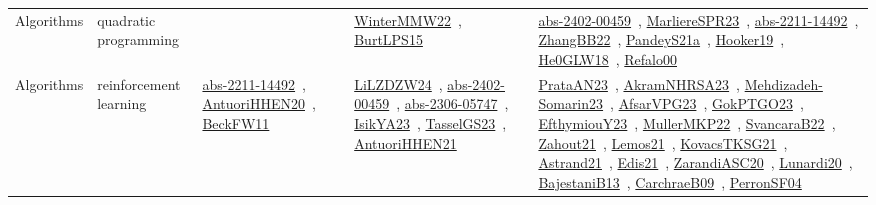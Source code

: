 {\begin{longtable}{lp{3cm}>{\raggedright\arraybackslash}p{6cm}>{\raggedright\arraybackslash}p{6cm}>{\raggedright\arraybackslash}p{8cm}}
Algorithms & quadratic programming &  & \href{../works/WinterMMW22.pdf}{WinterMMW22}~\cite{WinterMMW22}, \href{../works/BurtLPS15.pdf}{BurtLPS15}~\cite{BurtLPS15} & \href{../works/abs-2402-00459.pdf}{abs-2402-00459}~\cite{abs-2402-00459}, \href{../works/MarliereSPR23.pdf}{MarliereSPR23}~\cite{MarliereSPR23}, \href{../works/abs-2211-14492.pdf}{abs-2211-14492}~\cite{abs-2211-14492}, \href{../works/ZhangBB22.pdf}{ZhangBB22}~\cite{ZhangBB22}, \href{../works/PandeyS21a.pdf}{PandeyS21a}~\cite{PandeyS21a}, \href{../works/Hooker19.pdf}{Hooker19}~\cite{Hooker19}, \href{../works/He0GLW18.pdf}{He0GLW18}~\cite{He0GLW18}, \href{../works/Refalo00.pdf}{Refalo00}~\cite{Refalo00}\\
Algorithms & reinforcement learning & \href{../works/abs-2211-14492.pdf}{abs-2211-14492}~\cite{abs-2211-14492}, \href{../works/AntuoriHHEN20.pdf}{AntuoriHHEN20}~\cite{AntuoriHHEN20}, \href{../works/BeckFW11.pdf}{BeckFW11}~\cite{BeckFW11} & \href{../works/LiLZDZW24.pdf}{LiLZDZW24}~\cite{LiLZDZW24}, \href{../works/abs-2402-00459.pdf}{abs-2402-00459}~\cite{abs-2402-00459}, \href{../works/abs-2306-05747.pdf}{abs-2306-05747}~\cite{abs-2306-05747}, \href{../works/IsikYA23.pdf}{IsikYA23}~\cite{IsikYA23}, \href{../works/TasselGS23.pdf}{TasselGS23}~\cite{TasselGS23}, \href{../works/AntuoriHHEN21.pdf}{AntuoriHHEN21}~\cite{AntuoriHHEN21} & \href{../works/PrataAN23.pdf}{PrataAN23}~\cite{PrataAN23}, \href{../works/AkramNHRSA23.pdf}{AkramNHRSA23}~\cite{AkramNHRSA23}, \href{../works/Mehdizadeh-Somarin23.pdf}{Mehdizadeh-Somarin23}~\cite{Mehdizadeh-Somarin23}, \href{../works/AfsarVPG23.pdf}{AfsarVPG23}~\cite{AfsarVPG23}, \href{../works/GokPTGO23.pdf}{GokPTGO23}~\cite{GokPTGO23}, \href{../works/EfthymiouY23.pdf}{EfthymiouY23}~\cite{EfthymiouY23}, \href{../works/MullerMKP22.pdf}{MullerMKP22}~\cite{MullerMKP22}, \href{../works/SvancaraB22.pdf}{SvancaraB22}~\cite{SvancaraB22}, \href{../works/Zahout21.pdf}{Zahout21}~\cite{Zahout21}, \href{../works/Lemos21.pdf}{Lemos21}~\cite{Lemos21}, \href{../works/KovacsTKSG21.pdf}{KovacsTKSG21}~\cite{KovacsTKSG21}, \href{../works/Astrand21.pdf}{Astrand21}~\cite{Astrand21}, \href{../works/Edis21.pdf}{Edis21}~\cite{Edis21}, \href{../works/ZarandiASC20.pdf}{ZarandiASC20}~\cite{ZarandiASC20}, \href{../works/Lunardi20.pdf}{Lunardi20}~\cite{Lunardi20}, \href{../works/BajestaniB13.pdf}{BajestaniB13}~\cite{BajestaniB13}, \href{../works/CarchraeB09.pdf}{CarchraeB09}~\cite{CarchraeB09}, \href{../works/PerronSF04.pdf}{PerronSF04}~\cite{PerronSF04}\\

\end{longtable}}
